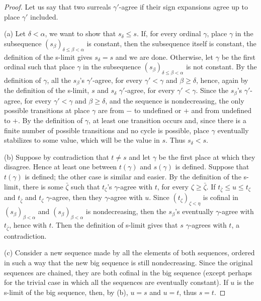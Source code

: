 \documentclass[12pt]{amsart}
\theoremstyle{definition}
\theoremstyle{remark}
\begin{document}
\begin{proof} 
Let us say that two surreals
$\gamma'$-agree if  their sign expansions 
 agree up to place $\gamma'$ included. 

(a) Let $ \delta   <  \alpha $,
we want to show that 
 $ s_ \delta  \leq s$.
If, for every ordinal $\gamma$, 
place $\gamma$ in the subsequence
 $( s _ \beta  ) _{ \delta \leq \beta  < \alpha  } $ is constant,
 then the subsequence itself is constant, the definition 
of the s-limit gives 
$ s_ \delta  = s$ and we are done.
Otherwise, let $\gamma$ be the first ordinal 
such that place $\gamma$ in the subsequence
 $( s _ \beta  ) _{  \delta \leq \beta  < \alpha  } $ is not  constant.
By the definition of $\gamma$, all
the $s_\beta$'s $\gamma'$-agree, for every $\gamma' < \gamma $
and $\beta \geq \delta $,
hence,   
again by the definition of the s-limit, $s$ and $ s_ \delta $
$\gamma'$-agree, for every $\gamma' < \gamma $.  
Since the $s_\beta$'s $\gamma'$-agree, for every $\gamma' < \gamma $
and $\beta \geq \delta $,
and the sequence is nondecreasing, the only possible
transitions at place $\gamma$ are from $-$ to undefined or 
$+$ and from undefined to $+$. By the definition of $\gamma$,
at least one transition occurs and, since there is a finite number
of possible transitions
and no cycle is possible, place $\gamma$ eventually stabilizes
to some value, which will be the value  in $s$. Thus  $ s_ \delta < s$.

(b) Suppose by contradiction that
$t\not =s$
and
let $\gamma$ be 
the first place at which they disagree.
Hence at least one between 
$t( \gamma )$ and 
$s ( \gamma )$ is defined.
Suppose that $t( \gamma )$ is defined;
the other case is similar and easier.
By the definition of the s-limit, there is some
$\bar {\zeta}$ such that 
  $t _ \zeta   $'s $\gamma$-agree with $t$,   
for every $\zeta \geq \bar {\zeta}$.
If 
$t _{\bar {\zeta}} \leq u \leq t _ \zeta  $ 
and $t _{\bar {\zeta}} $ and $  t _ \zeta  $
$\gamma$-agree, then they $\gamma$-agree with $u$.  
Since 
$( t _ \zeta  ) _{ \zeta  < \eta } $ is 
cofinal in 
 $( s _ \beta  ) _{ \beta  < \alpha  } $
and
 $( s _ \beta  ) _{ \beta  < \alpha  } $ is nondecreasing,
then the $s_ \beta $'s eventually $\gamma$-agree with 
$t _{\bar {\zeta}}$, hence with $t$. Then the definition of s-limit  
gives that $s$  $\gamma$-agrees with 
$t$, a contradiction.

(c) Consider a new sequence made by all the elements
of both sequences, ordered in such a way that the new big
sequence is still nondecreasing.
Since the original sequences are chained,
 they are both cofinal in the big sequence
(except perhaps for the trivial case in which all
 the sequences are eventually constant).
If $u$ is the  s-limit of the big sequence, then, by (b),
$u=s$ and  $u=t$, thus $s=t$.  
\end{proof}   
\end{document}
